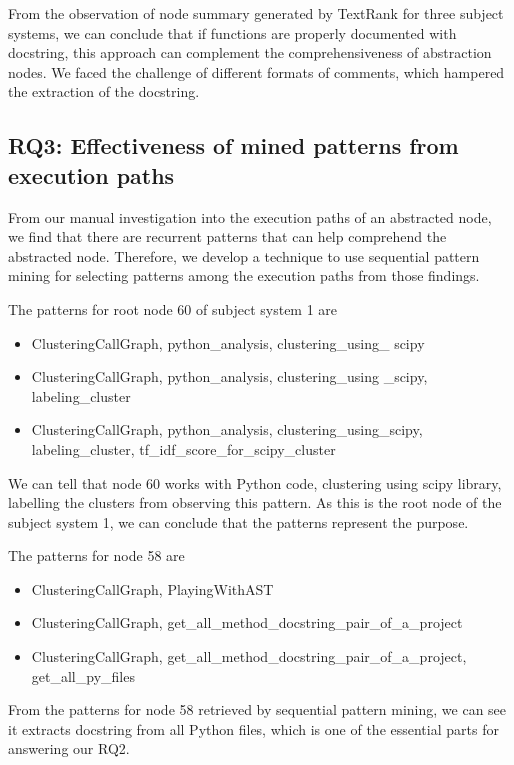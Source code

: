 From the observation of node summary generated by TextRank for three subject systems, we can conclude that if functions are properly documented with docstring, this approach can complement the comprehensiveness of abstraction nodes. We faced the challenge of different formats of comments, which hampered the extraction of the docstring.  
 

\subsection{ RQ3: Effectiveness of mined patterns from execution paths}
From our manual investigation into the execution paths of an abstracted node, we find that there are recurrent patterns that can help comprehend the abstracted node. Therefore, we develop a technique to use sequential pattern mining for selecting patterns among the execution paths from those findings. 

The patterns for root node 60 of subject system 1 are

\begin{itemize}
    \item ClusteringCallGraph, python\_analysis, clustering\_using\_
    scipy
    \item ClusteringCallGraph, python\_analysis, clustering\_using
    \_scipy, labeling\_cluster
    \item ClusteringCallGraph, python\_analysis, clustering\_using\_scipy,
labeling\_cluster, tf\_idf\_score\_for\_scipy\_cluster
\end{itemize}
We can tell that node 60 works with Python code, clustering using scipy library, labelling the clusters from observing this pattern. As this is the root node of the subject system 1, we can conclude that the patterns represent the purpose.

The patterns for node 58 are 

\begin{itemize}
    \item ClusteringCallGraph, PlayingWithAST
    \item ClusteringCallGraph, get\_all\_method\_docstring\_pair\_of\_a\_project
    \item ClusteringCallGraph, get\_all\_method\_docstring\_pair\_of\_a\_project, get\_all\_py\_files
\end{itemize}
From the patterns for node 58 retrieved by sequential pattern mining, we can see it extracts docstring from all Python files, which is one of the essential parts for answering our RQ2. 

